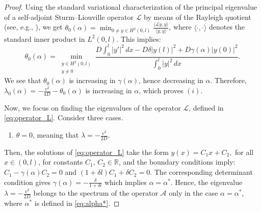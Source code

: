 \documentclass{mpi2015-cscpreprint}
\numberwithin{equation}{section}
\begin{document}
\begin{proof}
Using the standard variational characterization of the principal eigenvalue of a self-adjoint Sturm--Liouville operator $\mathcal{L}$ by means of the Rayleigh quotient (see, e.g., \cite{Zet2005}), we get $\theta_0(\alpha)=\min_{0\neq y\in H^2(0,l)}\frac{\langle\mathcal{L}y,y\rangle}{\langle y,y\rangle}$, where $\langle\cdot,\cdot\rangle$ denotes the standard inner product in $L^2(0,l)$. This implies:
\begin{equation*}
\theta_0(\alpha)=\min_{\substack{y\in H^2(0,l)\\ y\neq 0}}\frac{D\int_0^l |y'|^2\,dx - D\delta |y(l)|^2 + D\gamma(\alpha)|y(0)|^2}
{\int_0^l |y|^2\,dx}.
\end{equation*}
We see that $\theta_0(\alpha)$ is increasing in $\gamma(\alpha)$, hence decreasing in $\alpha$.
Therefore, $\lambda_0(\alpha) = -\frac{v^2}{4D} - \theta_0(\alpha)$ is increasing in $\alpha$, which proves $(i)$.

Now, we focus on finding the eigenvalues of the operator $\mathcal{L}$, defined in \eqref{eq:operator_L}. Consider three cases.
\begin{enumerate}
    \item[1)] $\theta=0$, meaning that $\lambda=-\frac{v^2}{2D}$.
\end{enumerate}
Then, the solutions of \eqref{eq:operator_L} take the form
$y(x)=C_1x+C_2,$ 
for all $x \in (0,l)$,
for constants $C_1,\,C_2\in\mathbb{R}$,
and the boundary conditions imply:
$C_1-\gamma(\alpha)C_2=0$ and
$(1+\delta l)C_1+\delta C_2=0$.
The corresponding determinant condition gives $\gamma(\alpha)=-\frac{\delta}{1+\delta l}$ which implies $\alpha=\alpha^*$. Hence, the eigenvalue $\lambda=-\frac{v^2}{2D}$ belongs to the spectrum of the operator $\mathcal{A}$ only in the case $\alpha=\alpha^*$, where $\alpha^*$ is defined in \eqref{eq:alpha*}.


\end{proof}
\end{document}
